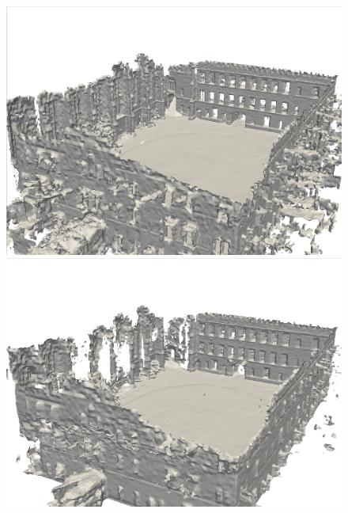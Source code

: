 \begin{figure}[htbp]
    \centering
\begin{minipage}{0.5\linewidth}
    \centering
    \includegraphics[width=1\linewidth]{figures/ncd_3_vox.png}
\end{minipage}\hfill
\begin{minipage}{0.5\linewidth}
    \centering
    \includegraphics[width=1\linewidth]{figures/ncd_3_bce.png}
\end{minipage}
\vfill
\begin{minipage}{0.5\linewidth}
    \centering

\end{minipage}
\end{figure}
